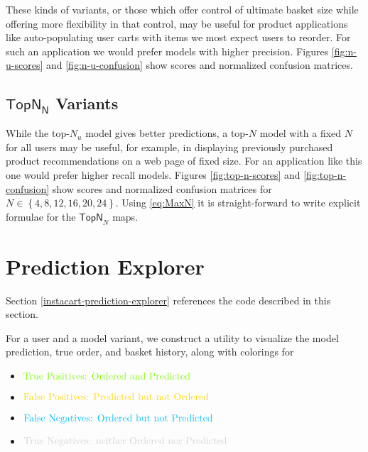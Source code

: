 \documentclass[11pt]{article}
\theoremstyle{definition}
\numberwithin{equation}{section}
\begin{document}
These kinds of variants, or those which offer control of ultimate basket
size while offering more flexibility in that control, may be useful for
product applications like auto-populating user carts with items we most
expect users to reorder. For such an application we would prefer models
with higher precision.
Figures \ref{fig:n-u-scores} and \ref{fig:n-u-confusion} show scores and
normalized confusion matrices.





    \hypertarget{topn-n-variants}{%
\subsection{\texorpdfstring{\(\mathsf{TopN_N}\) Variants}{TopN_N}}\label{topn-n-variants}}

While the top-\(N_u\) model gives better predictions, a top-\(N\) model
with a fixed \(N\) for all users may be useful, for example, in
displaying previously purchased product recommendations on a web page of
fixed size.
For an application like this
one would prefer higher recall models.
Figures \ref{fig:top-n-scores} and \ref{fig:top-n-confusion} show scores and
normalized confusion matrices for
\(N \in \left\{4, 8, 12, 16, 20, 24\right\}\). Using \eqref{eq:MaxN} it is
straight-forward to write explicit formulae for the $\mathsf{TopN}_N$ maps.







\hypertarget{prediction-explorer}{%
  \section{Prediction Explorer}\label{prediction-explorer}}
  
Section \ref{instacart-prediction-explorer} references the code described in this section.
  
For a user and a model variant, we construct a utility to visualize the model prediction, true order, and basket history,
along with colorings for
\begin{itemize}
\item \(\color{lawngreen}{\text{True Positives: Ordered and Predicted}}\) 
\item \(\color{gold}{\text{False Positives: Predicted but not Ordered}}\)
\item \(\color{deepskyblue}{\text{False Negatives: Ordered but not Predicted}}\)
\item \(\color{lightgrey}{\text{True Negatives: neither Ordered nor Predicted}}\)
\end{itemize}
\end{document}
